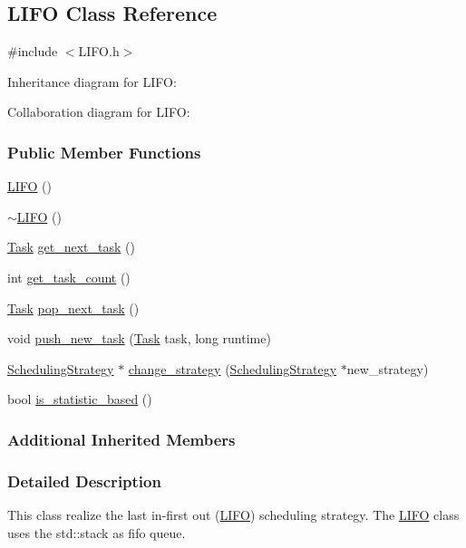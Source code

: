 \hypertarget{a00022}{}\subsection{L\+I\+F\+O Class Reference}
\label{a00022}


{\ttfamily \#include $<$L\+I\+F\+O.\+h$>$}



Inheritance diagram for L\+I\+F\+O\+:


Collaboration diagram for L\+I\+F\+O\+:
\subsubsection*{Public Member Functions}
\begin{DoxyCompactItemize}
\item 
\hyperlink{a00022_a594555175f097e6cf98db278d695dd6f}{L\+I\+F\+O} ()
\item 
\hyperlink{a00022_af8722c4d9d050eddf9e17714d5d90594}{$\sim$\+L\+I\+F\+O} ()
\item 
\hyperlink{a00002}{Task} \hyperlink{a00022_a53eb12a8a25f0fb4f57679206bf314dc}{get\+\_\+next\+\_\+task} ()
\item 
int \hyperlink{a00022_a6368d6fe156688f38d06a0ee75d57ef6}{get\+\_\+task\+\_\+count} ()
\item 
\hyperlink{a00002}{Task} \hyperlink{a00022_a1593c380d2f3f0e8f2247a2b61c9607c}{pop\+\_\+next\+\_\+task} ()
\item 
void \hyperlink{a00022_a422ac5b308521b23e97c25f7fc80ee7c}{push\+\_\+new\+\_\+task} (\hyperlink{a00002}{Task} task, long runtime)
\item 
\hyperlink{a00033}{Scheduling\+Strategy} $\ast$ \hyperlink{a00022_a6e3553527c29e2c90bf86d4a4e5cd570}{change\+\_\+strategy} (\hyperlink{a00033}{Scheduling\+Strategy} $\ast$new\+\_\+strategy)
\item 
bool \hyperlink{a00022_a8a8a3203290cda8521b74acde5fc334d}{is\+\_\+statistic\+\_\+based} ()
\end{DoxyCompactItemize}
\subsubsection*{Additional Inherited Members}


\subsubsection{Detailed Description}
This class realize the last in-\/first out (\hyperlink{a00022}{L\+I\+F\+O}) scheduling strategy. The \hyperlink{a00022}{L\+I\+F\+O} class uses the std\+::stack as fifo queue.

